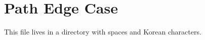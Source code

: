 \documentclass{article}
\begin{document}
\section{Path Edge Case}
This file lives in a directory with spaces and Korean characters.
\end{document}
